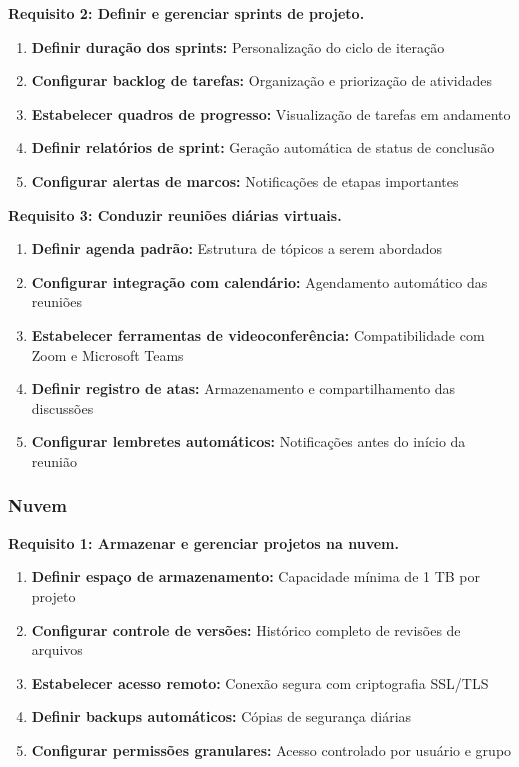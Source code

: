 \textbf{Requisito 2: Definir e gerenciar sprints de projeto.}
\begin{enumerate}[leftmargin=*]
    \item \textbf{Definir duração dos sprints:} Personalização do ciclo de iteração
    \item \textbf{Configurar backlog de tarefas:} Organização e priorização de atividades
    \item \textbf{Estabelecer quadros de progresso:} Visualização de tarefas em andamento
    \item \textbf{Definir relatórios de sprint:} Geração automática de status de conclusão
    \item \textbf{Configurar alertas de marcos:} Notificações de etapas importantes
\end{enumerate}

\textbf{Requisito 3: Conduzir reuniões diárias virtuais.}
\begin{enumerate}[leftmargin=*]
    \item \textbf{Definir agenda padrão:} Estrutura de tópicos a serem abordados
    \item \textbf{Configurar integração com calendário:} Agendamento automático das reuniões
    \item \textbf{Estabelecer ferramentas de videoconferência:} Compatibilidade com Zoom e Microsoft Teams
    \item \textbf{Definir registro de atas:} Armazenamento e compartilhamento das discussões
    \item \textbf{Configurar lembretes automáticos:} Notificações antes do início da reunião
\end{enumerate}

\subsubsection{Nuvem}
\textbf{Requisito 1: Armazenar e gerenciar projetos na nuvem.}
\begin{enumerate}[leftmargin=*]
    \item \textbf{Definir espaço de armazenamento:} Capacidade mínima de 1 TB por projeto
    \item \textbf{Configurar controle de versões:} Histórico completo de revisões de arquivos
    \item \textbf{Estabelecer acesso remoto:} Conexão segura com criptografia SSL/TLS
    \item \textbf{Definir backups automáticos:} Cópias de segurança diárias
    \item \textbf{Configurar permissões granulares:} Acesso controlado por usuário e grupo
\end{enumerate}

